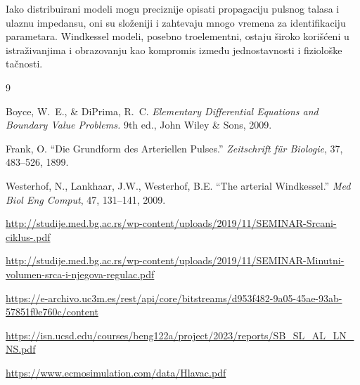 \documentclass[12pt,a4paper]{article}
\begin{document}
Iako distribuirani modeli mogu preciznije opisati propagaciju pulsnog talasa i ulaznu impedansu, oni su složeniji i zahtevaju mnogo vremena za identifikaciju parametara. Windkessel modeli, posebno troelementni, ostaju široko korišćeni u istraživanjima i obrazovanju kao kompromis između jednostavnosti i fiziološke tačnosti.


\newpage
\begin{thebibliography}{9}

Boyce, W.~E., \& DiPrima, R.~C.
\textit{Elementary Differential Equations and Boundary Value Problems.}
9th ed., John Wiley \& Sons, 2009.

Frank, O.
``Die Grundform des Arteriellen Pulses.''
\textit{Zeitschrift für Biologie}, 37, 483--526, 1899.

Westerhof, N., Lankhaar, J.W., Westerhof, B.E.
``The arterial Windkessel.''
\textit{Med Biol Eng Comput}, 47, 131--141, 2009.

\url{http://studije.med.bg.ac.rs/wp-content/uploads/2019/11/SEMINAR-Srcani-ciklus-.pdf}

\url{http://studije.med.bg.ac.rs/wp-content/uploads/2019/11/SEMINAR-Minutni-volumen-srca-i-njegova-regulac.pdf}

\url{https://e-archivo.uc3m.es/rest/api/core/bitstreams/d953f482-9a05-45ae-93ab-57851f0e760c/content}

\url{https://isn.ucsd.edu/courses/beng122a/project/2023/reports/SB_SL_AL_LN_NS.pdf}

\url{https://www.ecmosimulation.com/data/Hlavac.pdf}

\end{thebibliography}
\end{document}
